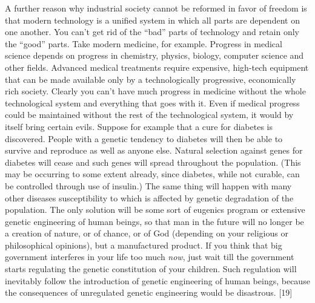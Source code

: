  A further reason why industrial society cannot be reformed in favor of freedom is that modern technology is a unified system in which all parts are dependent on one another. You can’t get rid of the “bad” parts of technology and retain only the “good” parts. Take modern medicine, for example. Progress in medical science depends on progress in chemistry, physics, biology, computer science and other fields. Advanced medical treatments require expensive, high-tech equipment that can be made available only by a technologically progressive, economically rich society. Clearly you can’t have much progress in medicine without the whole technological system and everything that goes with it.\break
{} Even if medical progress could be maintained without the rest of the technological system, it would by itself bring certain evils. Suppose for example that a cure for diabetes is discovered. People with a genetic tendency to diabetes will then be able to survive and reproduce as well as anyone else. Natural selection against genes for diabetes will cease and such genes will spread throughout the population. (This may be occurring to some extent already, since diabetes, while not curable, can be controlled through use of insulin.) The same thing will happen with many other diseases susceptibility to which is affected by genetic degradation of the population. The only solution will be some sort of eugenics program or extensive genetic engineering of human beings, so that man in the future will no longer be a creation of nature, or of chance, or of God (depending on your religious or philosophical opinions), but a manufactured product.
 If you think that big government interferes in your life too much {\em now}, just wait till the government starts regulating the genetic constitution of your children. Such regulation will inevitably follow the introduction of genetic engineering of human beings, because the consequences of unregulated genetic engineering would be disastrous. [19]\break
